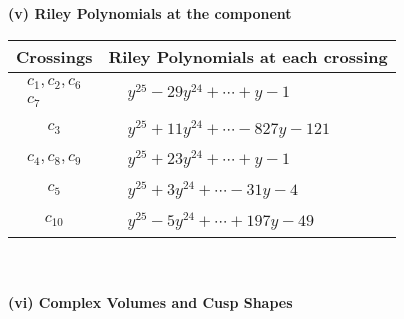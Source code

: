 \documentclass[1p]{elsarticle_modified}
\theoremstyle{definition}
\begin{document}
\newpage\renewcommand{\arraystretch}{1}
\flushleft \textbf{(v) Riley Polynomials at the component}\newline \\
\begin{tabular}{m{50pt}|m{274pt}}
Crossings & \hspace{64pt}Riley Polynomials at each crossing \\
\hline $$\begin{aligned}c_{1},c_{2},c_{6}\\c_{7}\end{aligned}$$&$\begin{aligned}
&y^{25}-29 y^{24}+\cdots+y-1
\end{aligned}$\\
\hline $$\begin{aligned}c_{3}\end{aligned}$$&$\begin{aligned}
&y^{25}+11 y^{24}+\cdots-827 y-121
\end{aligned}$\\
\hline $$\begin{aligned}c_{4},c_{8},c_{9}\end{aligned}$$&$\begin{aligned}
&y^{25}+23 y^{24}+\cdots+y-1
\end{aligned}$\\
\hline $$\begin{aligned}c_{5}\end{aligned}$$&$\begin{aligned}
&y^{25}+3 y^{24}+\cdots-31 y-4
\end{aligned}$\\
\hline $$\begin{aligned}c_{10}\end{aligned}$$&$\begin{aligned}
&y^{25}-5 y^{24}+\cdots+197 y-49
\end{aligned}$\\
\hline
\end{tabular}\\~\\
\newpage\flushleft \textbf{(vi) Complex Volumes and Cusp Shapes}
\end{document}
